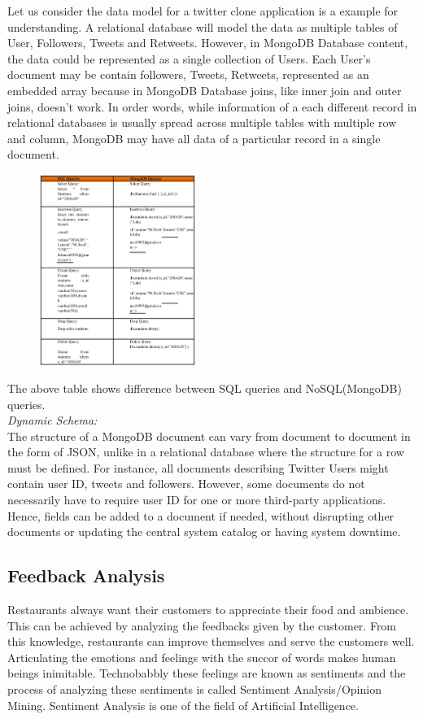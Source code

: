 \documentclass[conference]{IEEEtran}
\begin{document}
Let us consider the data model for a twitter clone application is a example for understanding. A relational database will model the data as multiple tables of User, Followers, Tweets and Retweets. However, in MongoDB Database content, the data could be represented as a single collection of Users. Each User’s document may be contain followers, Tweets, Retweets, represented as an embedded array because in MongoDB Database joins, like inner join and outer joins, doesn't work. In order words, while information of a each different record in relational databases is usually spread across multiple tables with multiple row and column, MongoDB may have all data of a particular record in a single document.

\begin{figure}[!ht]
	\centering
	\includegraphics[width=0.45\textwidth]{table-1.jpg}
\end{figure}

The above table shows difference between SQL queries and NoSQL(MongoDB) queries\cite{b7}.\\

\textit{Dynamic Schema:}\\
The structure of a MongoDB document can vary from document to document in the form of JSON, unlike in a relational database where the structure for a row must be defined. For instance, all documents describing Twitter Users might contain user ID, tweets and followers. However, some documents do not necessarily have to require user ID for one or more third-party applications. Hence, fields can be added to a document if needed, without disrupting other documents or updating the central system catalog or having system downtime.
 


\subsection{\textbf{Feedback Analysis}}
Restaurants always want their customers to appreciate their food and ambience. This can be achieved by analyzing the feedbacks given by the customer. From this knowledge, restaurants can improve themselves and serve the customers well.\\
Articulating the emotions and feelings with the succor of words makes human beings inimitable. Technobabbly these feelings are known as sentiments and the process of analyzing these sentiments is called Sentiment Analysis/Opinion Mining. Sentiment Analysis is one of the field of Artificial Intelligence.
\end{document}
